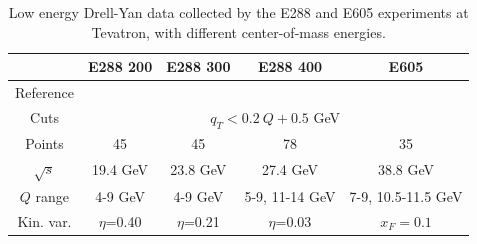 \documentclass[aps,preprintnumbers,showpacs,nofootinbib,superscriptaddress,floatfix]{revtex4}
\begin{document}
\begin{table}[h!]
\begin{center}
\renewcommand{\tabcolsep}{0.4pc} %
\renewcommand{\arraystretch}{1.2} %
\begin{tabular}{|c|c|c|c|c|}
 \hline
 ~                        &  E288 200    &  E288 300        &  E288 400          &  E605                \\
 \hline
Reference               &  \cite{Ito:1980ev}  &   \cite{Ito:1980ev}  &  \cite{Ito:1980ev}  &   \cite{Moreno:1990sf}  \\
\hline
Cuts             & \multicolumn{4}{c|}{$q_T < 0.2\ Q +0.5$ GeV}
\\
 \hline
 Points                   &      45      &   45             &       78           &     35               \\
 \hline
 $\sqrt{s}$               &    19.4 GeV   &   23.8 GeV        &      27.4 GeV    &  38.8 GeV           \\
\hline
$Q$ range                 &  4-9 GeV      &  4-9 GeV         &  5-9, 11-14 GeV   &  7-9, 10.5-11.5 GeV   \\
 \hline
 Kin. var.           & $\eta$=0.40         &  $\eta$=0.21          &   $\eta$=0.03         &    $x_F=0.1$         \\
\hline
\end{tabular}
\caption{Low energy Drell-Yan data collected by the E288 and E605 experiments at Tevatron, with different center-of-mass energies.}
\label{t:data_DY}
\end{center}
\end{table}
\end{document}
